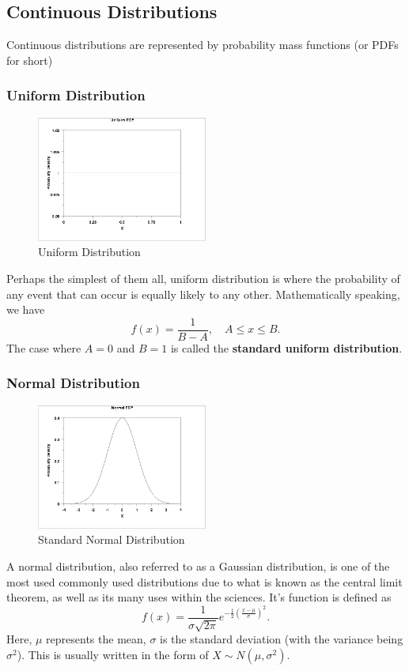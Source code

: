 \documentclass{article}
\begin{document}
\subsection{Continuous Distributions}
Continuous distributions are represented by probability mass functions (or PDFs for short)

\subsubsection{Uniform Distribution}
\begin{figure}[H]
\centering
\includegraphics[width=0.5\textwidth]{images/unipdf.png}
\caption{Uniform Distribution}
\end{figure}

Perhaps the simplest of them all, uniform distribution is where the probability of any event that can occur is equally likely to any other. Mathematically speaking, we have
\begin{equation}
    f(x) = \frac{1}{B-A},\quad A\leq x \leq B.
\end{equation}
The case where $A=0$ and $B=1$ is called the \textbf{standard uniform distribution}.

\subsubsection{Normal Distribution}
\begin{figure}[H]
\centering
\includegraphics[width=0.5\textwidth]{images/norpdf.png}
\caption{Standard Normal Distribution} \label{fig:stand_norm_dis}
\end{figure}
A normal distribution, also referred to as a Gaussian distribution, is one of the most used commonly used distributions due to what is known as the central limit theorem, as well as its many uses within the sciences. It's function is defined as
\begin{equation}
    f(x) = \frac{1}{\sigma\sqrt{2\pi}}e^{-\frac{1}{2}\left( \frac{x-\mu}{\sigma} \right)^2}.
\end{equation}
Here, $\mu$ represents the mean, $\sigma$ is the standard deviation (with the variance being $\sigma^2$). This is usually written in the form of $X\sim N(\mu,\sigma^2)$.
\end{document}
